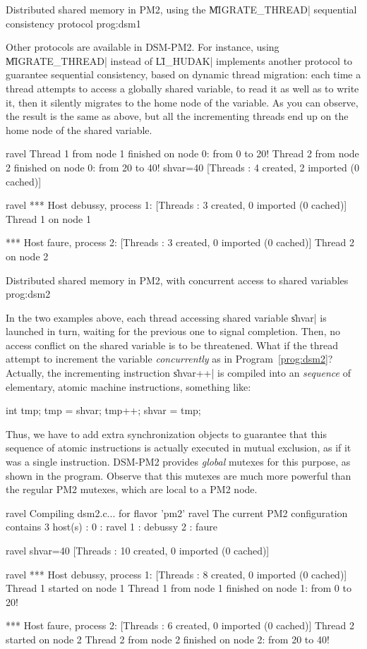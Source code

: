  {Distributed shared memory in PM2, using
  the \|MIGRATE_THREAD| sequential consistency protocol}
{prog:dsm1}

Other protocols are available in DSM-PM2. For instance, using
\|MIGRATE_THREAD| instead of \|LI_HUDAK| implements another protocol
to guarantee sequential consistency, based on dynamic thread migration:
each time a thread attempts to access a globally shared variable, to
read it as well as to write it, then it silently migrates to the home
node of the variable. As you can observe, the result is the same as
above, but all the incrementing threads end up on the home node of
the shared variable.
\begin{shell}
ravel%
Thread 1 from node 1 finished on node 0: from 0 to 20!
Thread 2 from node 2 finished on node 0: from 20 to 40!
shvar=40
[Threads : 4 created, 2 imported (0 cached)]

ravel%
*** Host debussy, process 1:
[Threads : 3 created, 0 imported (0 cached)]
Thread 1 on node 1

*** Host faure, process 2:
[Threads : 3 created, 0 imported (0 cached)]
Thread 2 on node 2
\end{shell}


 {Distributed shared memory in PM2, with
  concurrent access to shared variables} {prog:dsm2}

In the two examples above, each thread accessing shared variable
\|shvar| is launched in turn, waiting for the previous one to signal
completion. Then, no access conflict on the shared variable is to be
threatened. What if the thread attempt to increment the variable
\emph{concurrently} as in Program~\ref{prog:dsm2}? Actually, the
incrementing instruction \|shvar++| is compiled into an
\emph{sequence} of elementary, atomic machine instructions, something
like:
\begin{program}
{int tmp; tmp = shvar; tmp++; shvar = tmp;}
\end{program}
Thus, we have to add extra synchronization objects to guarantee that
this sequence of atomic instructions is actually executed in mutual
exclusion, as if it was a single instruction. DSM-PM2 provides
\emph{global} mutexes for this purpose, as shown in the program.
Observe that this mutexes are much more powerful than the regular PM2
mutexes, which are local to a PM2 node.
\begin{shell}
ravel%
Compiling dsm2.c... for flavor 'pm2'
ravel%
The current PM2 configuration contains 3 host(s) :
0 : ravel
1 : debussy
2 : faure

ravel%
shvar=40
[Threads : 10 created, 0 imported (0 cached)]

ravel%
*** Host debussy, process 1:
[Threads : 8 created, 0 imported (0 cached)]
Thread 1 started on node 1
Thread 1 from node 1 finished on node 1: from 0 to 20!

*** Host faure, process 2:
[Threads : 6 created, 0 imported (0 cached)]
Thread 2 started on node 2
Thread 2 from node 2 finished on node 2: from 20 to 40!
\end{shell}

